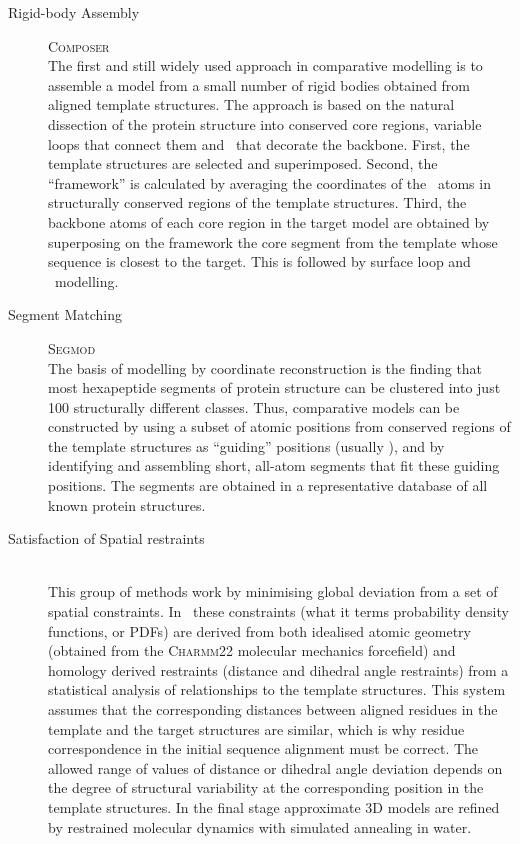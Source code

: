 \begin{description} \isep
\item[Rigid-body Assembly] \eg \textsc{Composer}\cite{METHOD:COMPOSER} \\
The first and still widely used approach in comparative modelling is to assemble a model from a small number of rigid bodies obtained from aligned template structures. The approach is based on the natural dissection of the protein structure into conserved core regions, variable loops that connect them and \sidechains\ that decorate the backbone. First, the template structures are selected and superimposed. Second, the ``framework'' is calculated by averaging the coordinates of the \ca\ atoms in structurally conserved regions of the template structures. Third, the backbone atoms of each core region in the target model are obtained by superposing on the framework the core segment from the template whose sequence is closest to the target. This is followed by surface loop and \sidechain\ modelling.

\item[Segment Matching] \eg \textsc{Segmod}\cite{METHOD:SEGMOD} \\
The basis of modelling by coordinate reconstruction is the finding that most hexapeptide segments of protein structure can be clustered into just 100 structurally different classes\cite{METHOD:Unger1989}. Thus, comparative models can be constructed by using a subset of atomic positions from conserved regions of the template structures as ``guiding'' positions (usually \ca), and by identifying and assembling short, all-atom segments that fit these guiding positions. The segments are obtained in a representative database of all known protein structures\cite{METHOD:SEGMOD}.

\item[Satisfaction of Spatial restraints] \eg \modeller\cite{METHOD:MODELLER}
\\
This group of methods work by minimising global deviation from a set of spatial constraints. In \modeller\ these constraints (what it terms probability density functions, or PDFs) are derived from both idealised atomic geometry (obtained from the \textsc{Charmm22}\cite{FORCEFIELD:CHARMM,COMPCHEM:MacKerell1998} molecular mechanics forcefield) and homology derived restraints (distance and dihedral angle restraints) from a statistical analysis of relationships to the template structures. This system assumes that the corresponding distances between aligned residues in the template and the target structures are similar, which is why residue correspondence in the initial sequence alignment must be correct. The allowed range of values of distance or dihedral angle deviation depends on the degree of structural variability at the corresponding position in the template structures. In the final stage approximate 3D models are refined by restrained molecular dynamics with simulated annealing in water.

\end{description}




